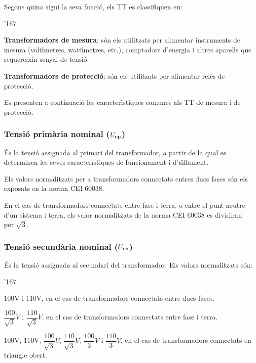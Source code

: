 Segons quina sigui la seva funci\'{o}, els TT es classifiquen en:
\begin{dinglist}{'167}
   \item \textbf{Transformadors de mesura}: s\'{o}n els utilitzats per alimentar
            instruments de mesura (volt\'{\i}metres, watt\'{\i}metres, etc.),
            comptadors d'energia i altres aparells que requereixin senyal de tensi\'{o}.
   \item \textbf{Transformadors de protecci\'{o}}: s\'{o}n els utilitzats per
   alimentar rel\`{e}s de protecci\'{o}.
\end{dinglist}

Es presenten a continuaci\'{o} les caracter\'{\i}stiques comunes als TT de
mesura i de protecci\'{o}.

\subsubsection{Tensi\'{o} prim\`{a}ria nominal ($U_\mathrm{np}$)}

\'{E}s la tensi\'{o} assignada al primari del transformador, a partir de la
qual es determinen les seves caracter\'{\i}stiques de funcionament i
d'a\"{\i}llament.

Els valors normalitzats per a transformadors connectats entres dues fases s\'{o}n els exposats en la norma \textsf{CEI 60038}.

En el cas de transformadors connectats entre fase i terra, o entre el punt neutre d'un sistema i terra, els valor normalitzats de la norma \textsf{CEI 60038} es dividiran per $\sqrt{3}$.


\subsubsection{Tensi\'{o} secund\`{a}ria nominal ($U_\mathrm{ns}$)}

\'{E}s la tensi\'{o} assignada al secundari del transformador.
Els valors normalitzats s\'{o}n:
\begin{dinglist}{'167}
    \item 100\unit{V} i 110\unit{V}, en el cas de transformadors connectats
    entre dues fases.
    \item $\dfrac{100}{\sqrt{3}}\unit{V}$ i
        $\dfrac{110}{\sqrt{3}}\unit{V}$, en el cas de transformadors
        connectats entre fase i terra.
    \item 100\unit{V}, 110\unit{V}, $\dfrac{100}{\sqrt{3}}\unit{V}$,
    $\dfrac{110}{\sqrt{3}}\unit{V}$, $\dfrac{100}{3}\unit{V}$   i
    $\dfrac{110}{3}\unit{V}$, en el cas de transformadors
    connectats en triangle obert.
\end{dinglist}

